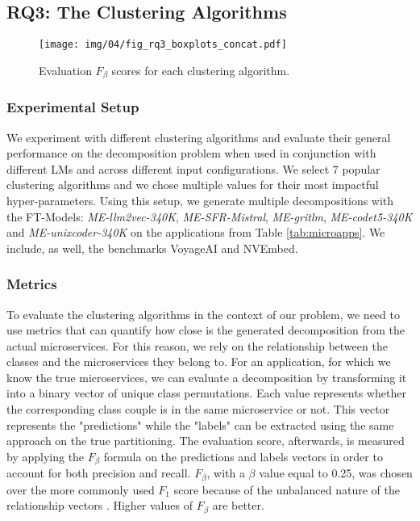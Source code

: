 \subsection{RQ3: The Clustering Algorithms}\label{subsec:rq3clustering}







\begin{figure}[htbp]
\centering
\texttt{[image: img/04/fig\_rq3\_boxplots\_concat.pdf]}
\caption{Evaluation $F_\beta$ scores for each clustering algorithm.} \label{fig:rq3boxplots}
\end{figure}


\subsubsection{Experimental Setup}
We experiment with different clustering algorithms and evaluate their general performance on the decomposition problem when used in conjunction with different LMs and across different input configurations. We select 7 popular clustering algorithms and we chose multiple values for their most impactful hyper-parameters. Using this setup, we generate multiple decompositions with the FT-Models: \textit{ME-llm2vec-340K}, \textit{ME-SFR-Mistral}, \textit{ME-gritlm}, \textit{ME-codet5-340K} and \textit{ME-unixcoder-340K} on the applications from Table \ref{tab:microapps}. We include, as well, the benchmarks VoyageAI and NVEmbed.




\subsubsection{Metrics}
To evaluate the clustering algorithms in the context of our problem, we need to use metrics that can quantify how close is the generated decomposition from the actual microservices. For this reason, we rely on the relationship between the classes and the microservices they belong to. For an application, for which we know the true microservices, we can evaluate a decomposition by transforming it into a binary vector of unique class permutations. Each value represents whether the corresponding class couple is in the same microservice or not. This vector represents the "predictions" while the "labels" can be extracted using the same approach on the true partitioning. The evaluation score, afterwards, is measured by applying the $F_\beta$ formula on the predictions and labels vectors in order to account for both precision and recall. $F_\beta$, with a $\beta$ value equal to 0.25, was chosen over the more commonly used $F_1$ score because of the unbalanced nature of the relationship vectors \cite{khaled2024rldec}. Higher values of $F_\beta$ are better.


